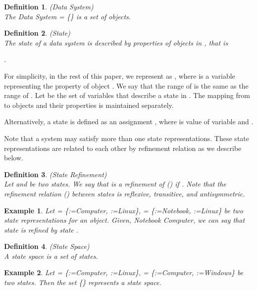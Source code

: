 \documentclass[12pt,journal,letterpaper,onecolumn]{IEEEtran}
\newtheorem{definition}{Definition}[section]
\newtheorem{example}{Example}[section]
\begin{document}
\begin{definition}(Data System)\\
The Data System  = \{\} is a set of objects.
\label{def:ds}
\end{definition}

\begin{definition}(State)\\
The state of a data system  is described by properties of
objects in , that is
  
.
 \label{def:state}
\end{definition}

For simplicity, in
the rest of this paper, we represent  as ,
where  is a variable representing the property  of object
. We say that the range of  is the same as the range of
. Let  be the set of
variables that describe a state in . The mapping from   to
objects and their properties is maintained separately.

 Alternatively, a state  is defined as an assignment
, where  is value of
variable  and .


Note that a system may satisfy more than one state representations.
These state representations are related to each other by refinement
relation as we describe below.
\begin{definition} (State Refinement)\\
\noindent Let  and  be two states. We say that  is
a refinement of  () if . Note that the refinement relation ()
between states is reflexive, transitive, and antisymmetric.
\end{definition}

\begin{example} Let   = \{:={\ttfamily Computer},
:={\ttfamily Linux\}}, = \{:={\ttfamily Notebook}, :={\ttfamily Linux\}} be two state representations for an object. Given,
{\ttfamily Notebook}  {\ttfamily Computer}, we can say that
state  is refined by state  . \label{eg:state}
\end{example}


\begin{definition}(State Space)\\
A state space is a set of states.
 \label{def:statespace}
\end{definition}

\begin{example} Let  = \{:={\ttfamily Computer}, :={\ttfamily Linux}\},
      = \{:={\ttfamily Computer}, :={\ttfamily Windows}\} be two states.
     Then the set \{\} represents a state space.
\label{eg:statespace1}
\end{example}
\end{document}
